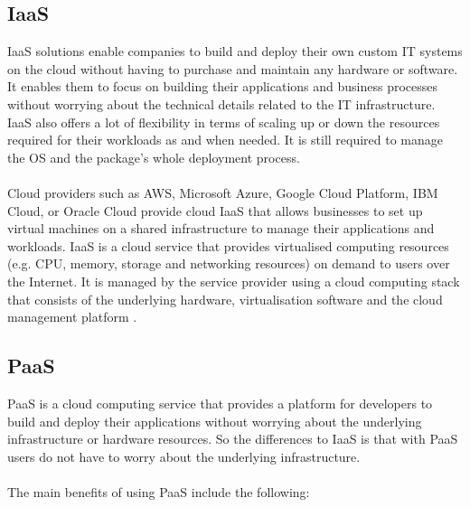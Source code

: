 \documentclass[BIF,Bachelor,nenglish]{twbook}%
\begin{document}
\subsection{\ac{IaaS}}
\ac{IaaS} solutions enable companies to build and deploy their own custom IT systems on the cloud without having to purchase and maintain any hardware or software. It enables them to focus on building their applications and business processes without worrying about the technical details related to the IT infrastructure. \ac{IaaS} also offers a lot of flexibility in terms of scaling up or down the resources required for their workloads as and when needed. It is still required to manage the OS and the package's whole deployment process.
\\
\\
Cloud providers such as AWS, Microsoft Azure, Google Cloud Platform, IBM Cloud, or Oracle Cloud provide cloud \ac{IaaS} that allows businesses to set up virtual machines on a shared infrastructure to manage their applications and workloads. \ac{IaaS} is a cloud service that provides virtualised computing resources (e.g. CPU, memory, storage and networking resources) on demand to users over the Internet. It is managed by the service provider using a cloud computing stack that consists of the underlying hardware, virtualisation software and the cloud management platform \cite{buy2019} .


\subsection{\ac{PaaS}}
\ac{PaaS} is a cloud computing service that provides a platform for developers to build and deploy their applications without worrying about the underlying infrastructure or hardware resources. So the differences to \ac{IaaS} is that with \ac{PaaS} users do not have to worry about the underlying infrastructure.
\\
\\
The main benefits of using \ac{PaaS} include the following:
\end{document}
